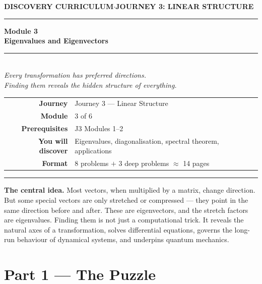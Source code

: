 \documentclass[12pt, a4paper]{article}
\newcounter{problem}
\begin{document}
\thispagestyle{empty}
\begin{center}
{\small\color{MidBlue}\textbf{DISCOVERY CURRICULUM}\quad$\cdot$\quad\textbf{JOURNEY 3: LINEAR STRUCTURE}}
\vspace{0.6cm}

{\color{NavyBlue}\rule{\linewidth}{2pt}}
\vspace{0.5cm}

{\Huge\bfseries\color{NavyBlue}Module 3}\\[0.3cm]
{\LARGE\bfseries\color{MidBlue}Eigenvalues and Eigenvectors}\\[0.4cm]
{\color{Gold}\rule{0.4\linewidth}{1.2pt}}\\[0.4cm]
{\large\itshape\color{DarkGrey}
Every transformation has preferred directions.\\[0.15cm]
Finding them reveals the hidden structure of everything.}

\vspace{1cm}
\begin{tabular}{rl}
\color{DarkGrey}\textbf{Journey}     & Journey 3 --- Linear Structure \\[4pt]
\color{DarkGrey}\textbf{Module}      & 3 of 6 \\[4pt]
\color{DarkGrey}\textbf{Prerequisites} & J3 Modules 1--2 \\[4pt]
\color{DarkGrey}\textbf{You will discover} & Eigenvalues, diagonalisation, spectral theorem, applications \\[4pt]
\color{DarkGrey}\textbf{Format}      & 8 problems $+$ 3 deep problems $\approx$ 14 pages \\
\end{tabular}
\vspace{1cm}

{\color{NavyBlue}\rule{\linewidth}{2pt}}
\end{center}

\vspace{0.5cm}
\noindent\textbf{The central idea.}
Most vectors, when multiplied by a matrix, change direction. But some special vectors are only stretched or compressed --- they point in the same direction before and after. These are eigenvectors, and the stretch factors are eigenvalues. Finding them is not just a computational trick. It reveals the natural axes of a transformation, solves differential equations, governs the long-run behaviour of dynamical systems, and underpins quantum mechanics.

\newpage

\section{Part 1 \texorpdfstring{---}{--} The Puzzle}
\end{document}
